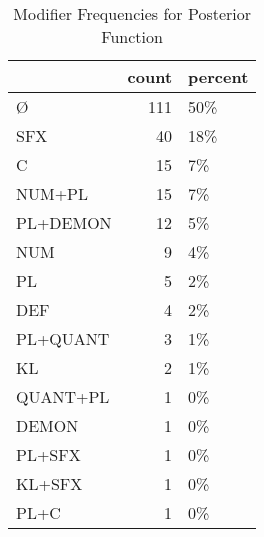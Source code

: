 \begin{table}[htbp!]
\centering
\caption{Modifier Frequencies for Posterior Function}
\label{table:post_mod_cp}
\begin{tabular}{lrl}
\toprule
{} &  count & percent \\
\midrule
Ø        &    111 &     50\% \\
SFX      &     40 &     18\% \\
C        &     15 &      7\% \\
NUM+PL   &     15 &      7\% \\
PL+DEMON &     12 &      5\% \\
NUM      &      9 &      4\% \\
PL       &      5 &      2\% \\
DEF      &      4 &      2\% \\
PL+QUANT &      3 &      1\% \\
KL       &      2 &      1\% \\
QUANT+PL &      1 &      0\% \\
DEMON    &      1 &      0\% \\
PL+SFX   &      1 &      0\% \\
KL+SFX   &      1 &      0\% \\
PL+C     &      1 &      0\% \\
\bottomrule
\end{tabular}
\end{table}
